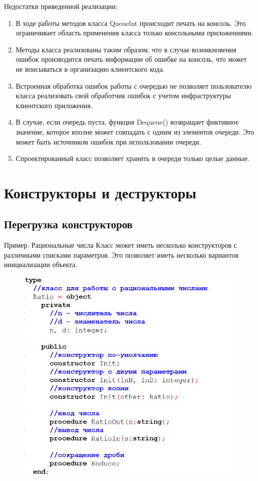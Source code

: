 \documentclass{beamer}
\begin{document}
\begin{frame}
Недостатки приведенной реализации:
\begin{enumerate}
\item В ходе работы методов класса Queuelnt происходит печать на консоль. Это
ограничивает область применения класса только консольными приложениями.
\item Методы класса реализованы таким образом, что в случае возникновения
ошибок производится печать информации об ошибке на консоль, что может не вписываться в организацию клиентского кода.
\item Встроенная обработка ошибок работы с очередью не позволяет пользователю класса реализовать свой обработчик ошибок с учетом инфраструктуры клиентского приложения.
\item В случае, если очередь пуста, функция Dequeue() возвращает фиктивное значение, которое вполне может совпадать с одним из элементов очереди. Это может быть источником ошибок при использовании очереди.
\item Спроектированный класс позволяет хранить в очереди только целые данные. 
\end{enumerate}
\end{frame}

\section{Конструкторы и деструкторы}
\subsection{Перегрузка конструкторов}
\begin{frame}{Пример. Рациональные числа}
Класс может иметь несколько конструкторов с различными списками параметров. 
Это позволяет иметь несколько вариантов инициализации объекта.
\begin{figure}[h]
\centering
\includegraphics[scale=0.3]{images/lec05-pic08.png}
\end{figure}
\end{frame}
\end{document}
